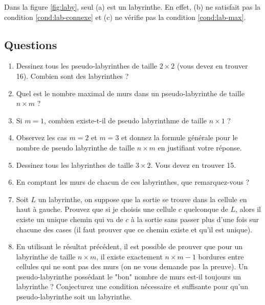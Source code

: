 \documentclass{../ficheTDTP}
\begin{document}
Dans la figure \ref{fig:laby}, seul (a) est un labyrinthe. En effet, (b) ne satisfait pas la condition \eqref{cond:lab-connexe} et (c) ne vérifie pas la condition \eqref{cond:lab-max}.


\subsection{Questions}

\begin{enumerate}

\item Dessinez tous les pseudo-labyrinthes de taille $2 \times 2$ (vous devez en trouver 16). Combien sont des labyrinthes ? 

\item Quel est le nombre maximal de murs dans un pseudo-labyrinthe de taille $n \times m$ ?

\item Si $m=1$, combien existe-t-il de pseudo labyrinthme de taille $n \times 1$ ?

\item Observez les cas $m=2$ et $m=3$ et donnez la formule générale pour le nombre de pseudo labyrinthe de taille $n \times m$ en justifiant votre réponse.

\item Dessinez tous les labyrinthes de taille $3 \times 2$. Vous devez en trouver 15. 

\item En comptant les murs de chacun de ces labyrinthes, que remarquez-vous ? 

\item Soit $L$ un labyrinthe, on suppose que la sortie se trouve dans la cellule en haut à gauche. Prouvez que si je choisis une cellule $c$ quelconque de $L$, alors il existe un unique chemin qui va de $c$ à la sortie sans passer plus d'une fois sur chacune des cases (il faut prouver que ce chemin existe et qu'il est unique). 


\item En utilisant le résultat précédent, il est possible de prouver que pour un labyrinthe de taille $n \times m$, il existe exactement $n \times m - 1$ bordures entre cellules qui ne sont pas des murs (on ne vous demande pas la preuve). Un pseudo-labyrinthe possédant le "bon" nombre de murs est-il toujours un labyrinthe ? Conjecturez une condition nécessaire et suffisante pour qu'un pseudo-labyrinthe soit un labyrinthe. 

\end{enumerate}
\end{document}
